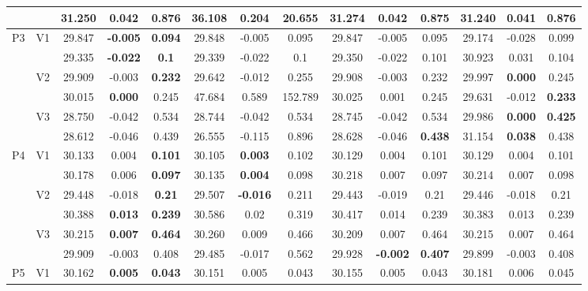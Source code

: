 \documentclass[12pt,a4paper]{article}
\begin{document}
\begin{sidewaystable}[ht]
{\begin{tabular}{cc|ccc|ccc|ccc|ccc|}
   &  & 31.250 & 0.042 & 0.876 & 36.108 & 0.204 & 20.655 & 31.274 & 0.042 & \textbf{0.875} & 31.240 & \textbf{0.041} & 0.876 \\ 
   \hline \hline\multirow{6}{*}{P3} & \multirow{2}{*}{V1} & 29.847 & \textbf{-0.005} & \textbf{0.094} & 29.848 & -0.005 & 0.095 & 29.847 & -0.005 & 0.095 & 29.174 & -0.028 & 0.099 \\ 
   &  & 29.335 & \textbf{-0.022} & \textbf{0.1} & 29.339 & -0.022 & 0.1 & 29.350 & -0.022 & 0.101 & 30.923 & 0.031 & 0.104 \\ 
   & \multirow{2}{*}{V2} & 29.909 & -0.003 & \textbf{0.232} & 29.642 & -0.012 & 0.255 & 29.908 & -0.003 & 0.232 & 29.997 & \textbf{0.000} & 0.245 \\ 
   &  & 30.015 & \textbf{0.000} & 0.245 & 47.684 & 0.589 & 152.789 & 30.025 & 0.001 & 0.245 & 29.631 & -0.012 & \textbf{0.233} \\ 
   & \multirow{2}{*}{V3} & 28.750 & -0.042 & 0.534 & 28.744 & -0.042 & 0.534 & 28.745 & -0.042 & 0.534 & 29.986 & \textbf{0.000} & \textbf{0.425} \\ 
   &  & 28.612 & -0.046 & 0.439 & 26.555 & -0.115 & 0.896 & 28.628 & -0.046 & \textbf{0.438} & 31.154 & \textbf{0.038} & 0.438 \\ 
   \hline \hline\multirow{6}{*}{P4} & \multirow{2}{*}{V1} & 30.133 & 0.004 & \textbf{0.101} & 30.105 & \textbf{0.003} & 0.102 & 30.129 & 0.004 & 0.101 & 30.129 & 0.004 & 0.101 \\ 
   &  & 30.178 & 0.006 & \textbf{0.097} & 30.135 & \textbf{0.004} & 0.098 & 30.218 & 0.007 & 0.097 & 30.214 & 0.007 & 0.098 \\ 
   & \multirow{2}{*}{V2} & 29.448 & -0.018 & \textbf{0.21} & 29.507 & \textbf{-0.016} & 0.211 & 29.443 & -0.019 & 0.21 & 29.446 & -0.018 & 0.21 \\ 
   &  & 30.388 & \textbf{0.013} & \textbf{0.239} & 30.586 & 0.02 & 0.319 & 30.417 & 0.014 & 0.239 & 30.383 & 0.013 & 0.239 \\ 
   & \multirow{2}{*}{V3} & 30.215 & \textbf{0.007} & \textbf{0.464} & 30.260 & 0.009 & 0.466 & 30.209 & 0.007 & 0.464 & 30.215 & 0.007 & 0.464 \\ 
   &  & 29.909 & -0.003 & 0.408 & 29.485 & -0.017 & 0.562 & 29.928 & \textbf{-0.002} & \textbf{0.407} & 29.899 & -0.003 & 0.408 \\ 
   \hline \hline\multirow{6}{*}{P5} & \multirow{2}{*}{V1} & 30.162 & \textbf{0.005} & \textbf{0.043} & 30.151 & 0.005 & 0.043 & 30.155 & 0.005 & 0.043 & 30.181 & 0.006 & 0.045 \\ 

\end{tabular}}
\end{sidewaystable}
\end{document}
